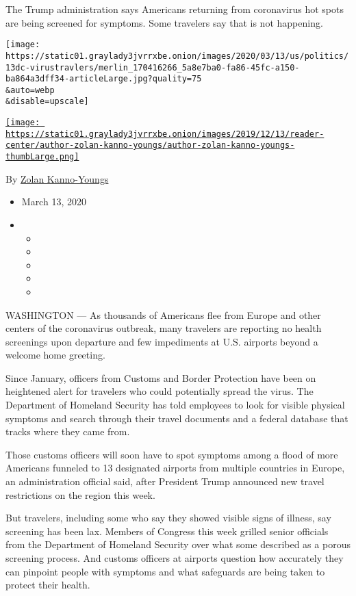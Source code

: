 The Trump administration says Americans returning from coronavirus hot
spots are being screened for symptoms. Some travelers say that is not
happening.

\texttt{[image: https://static01.graylady3jvrrxbe.onion/images/2020/03/13/us/politics/13dc-virustravlers/merlin\_170416266\_5a8e7ba0-fa86-45fc-a150-ba864a3dff34-articleLarge.jpg?quality=75\\\&auto=webp\\\&disable=upscale]}

\href{https://www.nytimes3xbfgragh.onion/by/zolan-kanno-youngs}{\texttt{[image: https://static01.graylady3jvrrxbe.onion/images/2019/12/13/reader-center/author-zolan-kanno-youngs/author-zolan-kanno-youngs-thumbLarge.png]}}

By \href{https://www.nytimes3xbfgragh.onion/by/zolan-kanno-youngs}{Zolan
Kanno-Youngs}

\begin{itemize}
\item
  March 13, 2020
\item
  \begin{itemize}
  \item
  \item
  \item
  \item
  \item
  \end{itemize}
\end{itemize}

WASHINGTON --- As thousands of Americans flee from Europe and other
centers of the coronavirus outbreak, many travelers are reporting no
health screenings upon departure and few impediments at U.S. airports
beyond a welcome home greeting.

Since January, officers from Customs and Border Protection have been on
heightened alert for travelers who could potentially spread the virus.
The Department of Homeland Security has told employees to look for
visible physical symptoms and search through their travel documents and
a federal database that tracks where they came from.

Those customs officers will soon have to spot symptoms among a flood of
more Americans funneled to 13 designated airports from multiple
countries in Europe, an administration official said, after President
Trump announced new travel restrictions on the region this week.

But travelers, including some who say they showed visible signs of
illness, say screening has been lax. Members of Congress this week
grilled senior officials from the Department of Homeland Security over
what some described as a porous screening process. And customs officers
at airports question how accurately they can pinpoint people with
symptoms and what safeguards are being taken to protect their health.

